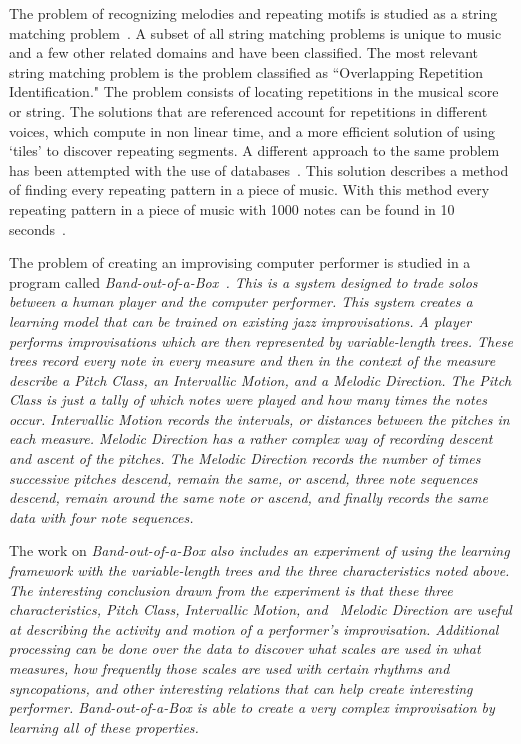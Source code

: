\documentclass[12pt]{ucthesis}
\begin{document}
The problem of recognizing melodies and repeating motifs is studied as a string matching problem~\cite{MelodicRecognition}. A subset of all string matching problems is unique to music and a few other related domains and have been classified. The most relevant string matching problem is the problem classified as ``Overlapping Repetition Identification." The problem consists of locating repetitions in the musical score or string. The solutions that are referenced account for repetitions in different voices, which compute in non linear time, and a more efficient solution of using `tiles' to discover repeating segments.  A different approach to the same problem has been attempted with the use of databases~\cite{musicDB}. This solution describes a method of finding every repeating pattern in a piece of music. With this method every repeating pattern in a piece of music with 1000 notes can be found in 10 seconds~\cite{musicDB}.

The problem of creating an improvising computer performer is studied in a program called \em{Band-out-of-a-Box}\em~\cite{bob}. This is a system designed to trade solos between a human player and the computer performer. This system creates a learning model that can be trained on existing jazz improvisations. A player performs improvisations which are then represented by variable-length trees. These trees record every note in every measure and then in the context of the measure describe a \em{Pitch Class, }\em an \em{Intervallic Motion, }\em and a \em{Melodic Direction. }\em The \em{Pitch Class }\em is just a tally of which notes were played and how many times the notes occur. \em{Intervallic Motion }\em records the intervals, or distances between the pitches in each measure.  \em{Melodic Direction }\em has a rather complex way of recording descent and ascent of the pitches.  The \em{Melodic Direction }\em records the number of times successive pitches descend, remain the same, or ascend, three note sequences descend, remain around the same note or ascend, and finally records the same data with four note sequences. 

The work on \em{Band-out-of-a-Box }\em also includes an experiment of using the learning framework with the variable-length trees and the three characteristics noted above. The interesting conclusion drawn from the experiment is that these three characteristics, \em{Pitch Class, Intervallic Motion, }\em and  ~\em{Melodic Direction }\em are useful at describing the activity and motion of a performer's improvisation. Additional processing can be done over the data to discover what scales are used in what measures, how frequently those scales are used with certain rhythms and syncopations, and other interesting relations that can help create interesting performer.  \em{Band-out-of-a-Box }\em is able to create a very complex improvisation by learning all of these properties.
\end{document}
